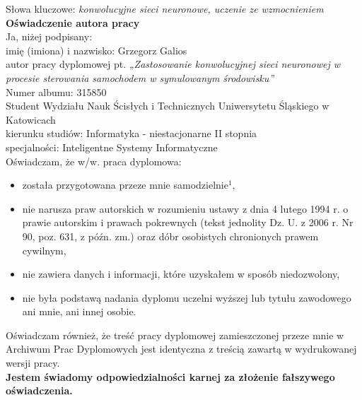 \documentclass[twoside,a4paper,12pt]{extreport} %
\begin{document}
\newpage

\setcounter{page}{1} \pagestyle{fancy}
\renewcommand{\chaptermark}[1]{\markboth{\chaptername%
\ \thechapter:\,\ #1}{}}
\renewcommand{\sectionmark}[1]{\markright{\thesection\,\ #1}}




\newpage
Słowa kluczowe: \hspace{0.5cm} \textit{konwolucyjne sieci neuronowe, uczenie ze wzmocnieniem} \\[1cm]
\textbf{Oświadczenie autora pracy}\\

Ja, niżej podpisany: \\

\hspace{1.5cm} imię (imiona) i nazwisko: Grzegorz Galios \\

\hspace{1.5cm} autor pracy dyplomowej pt. 
\textit{„Zastosowanie konwolucyjnej sieci neuronowej w procesie sterowania samochodem w symulowanym środowisku”}\\

Numer albumu: 315850 \\

Student Wydziału Nauk Ścisłych i Technicznych Uniwersytetu Śląskiego w Katowicach \\ 

kierunku studiów: Informatyka - niestacjonarne II stopnia \\

specjalności: Inteligentne Systemy Informatyczne \\

Oświadczam, że w/w. praca dyplomowa:   
\begin{itemize}
\item została przygotowana przeze mnie samodzielnie$^1$,  
\item nie narusza praw autorskich w rozumieniu ustawy z dnia 4 lutego 1994 r. o prawie autorskim i prawach pokrewnych (tekst jednolity Dz. U. z 2006 r. Nr 90, poz. 631, z późn. zm.) oraz dóbr osobistych chronionych prawem cywilnym,  
\item nie zawiera danych i informacji, które uzyskałem w sposób niedozwolony,  
\item nie była podstawą nadania dyplomu uczelni wyższej lub tytułu zawodowego ani mnie, ani innej osobie.  
\end{itemize}
Oświadczam również, że treść pracy dyplomowej zamieszczonej przeze mnie w Archiwum Prac Dyplomowych jest identyczna z treścią zawartą w wydrukowanej wersji pracy. \\[0.5cm]
\textbf{Jestem świadomy odpowiedzialności karnej za złożenie fałszywego oświadczenia.} \\[1.5cm]
\end{document}
